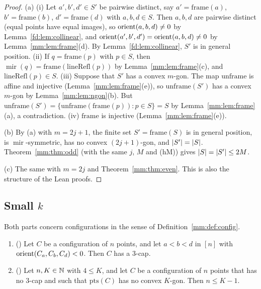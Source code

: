 \begin{proof}
(a) (i) Let $a',b',d'\in S'$ be pairwise distinct, say $a'=\mathrm{frame}(a)$, $b'=\mathrm{frame}(b)$,
$d'=\mathrm{frame}(d)$ with $a,b,d\in S$. Then $a,b,d$ are pairwise distinct (equal points have equal
images), so $\operatorname{orient}(a,b,d)\ne0$ by Lemma~\ref{fd:lem:collinear}, and
$\operatorname{orient}(a',b',d')=\operatorname{orient}(a,b,d)\ne0$ by Lemma~\ref{mm:lem:frame}(d). By Lemma~\ref{fd:lem:collinear},
$S'$ is in general position.
(ii) If $q=\mathrm{frame}(p)$ with $p\in S$, then $\operatorname{mir}(q)=\mathrm{frame}(\mathrm{lineRefl}(p))$
by Lemma~\ref{mm:lem:frame}(c), and $\mathrm{lineRefl}(p)\in S$.
(iii) Suppose that $S'$ has a convex $m$-gon. The map $\mathrm{unframe}$ is affine and injective
(Lemma~\ref{mm:lem:frame}(e)), so $\mathrm{unframe}(S')$ has a convex $m$-gon by
Lemma~\ref{mm:lem:ngon}(b). But $\mathrm{unframe}(S')=\{\mathrm{unframe}(\mathrm{frame}(p)):p\in S\}=S$ by
Lemma~\ref{mm:lem:frame}(a), a contradiction.
(iv) $\mathrm{frame}$ is injective (Lemma~\ref{mm:lem:frame}(e)).

(b) By (a) with $m=2j+1$, the finite set $S'=\mathrm{frame}(S)$ is in general position, is
$\operatorname{mir}$-symmetric, has no convex $(2j+1)$-gon, and $\lvert S'\rvert=\lvert S\rvert$.
Theorem~\ref{mm:thm:odd} (with the same $j$, $M$ and (hM)) gives $\lvert S\rvert=\lvert S'\rvert\le2M$.

(c) The same with $m=2j$ and Theorem~\ref{mm:thm:even}. This is also the structure of the Lean proofs.
\end{proof}

\subsection{Small \texorpdfstring{$k$}{k}}

\begin{lemma}\label{mm:lem:cup}
Both parts concern configurations in the sense of Definition~\ref{mm:def:config}.
\begin{enumerate}[label=(\alph*)]
\item () Let $C$ be a configuration of $n$ points, and let $a<b<d$ in $[n]$ with
  $\operatorname{orient}(C_a,C_b,C_d)<0$. Then $C$ has a $3$-cap.
\item () Let $n,K\in\mathbb N$ with $4\le K$, and let $C$ be a configuration of $n$ points
  that has no $3$-cap and such that $\mathrm{pts}(C)$ has no convex $K$-gon. Then $n\le K-1$.
\end{enumerate}
\end{lemma}

